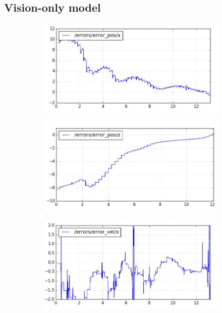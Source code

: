 \documentclass[conf]{new-aiaa}
\begin{document}
\subsection{Vision-only model}

\begin{figure}[h]
\begin{subfigure}{0.33\textwidth}
    \includegraphics[width=\linewidth]{error_pos_x.png}
    \caption{} \label{fig:errorx}
  \end{subfigure}%
  \hspace*{\fill}   %
  \begin{subfigure}{0.33\textwidth}
    \includegraphics[width=\linewidth]{error_pos_z.png}
    \caption{} \label{fig:errorz}
  \end{subfigure}%
  \hspace*{\fill}   
  \begin{subfigure}{0.33\textwidth}
    \includegraphics[width=\linewidth]{error_vel_x.png}

\end{subfigure}
\end{figure}
\end{document}
